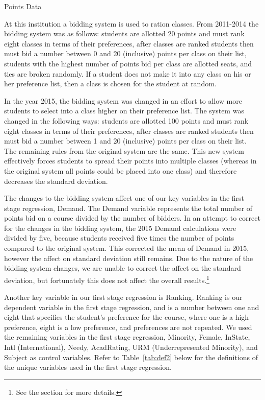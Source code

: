 \documentclass[12pt,a4paper,english,fleqn]{article}
\makeatletter
\newcommand{\tablelabel}[1]{Table~\ref{#1}}
\renewcommand\subsection{\@startsection{subsection}{2}
{\z@}{-3.25ex\@plus -1ex \@minus -.2ex}{1.5ex \@plus .2ex}{\normalfont\bf}}
\makeatother
\begin{document}
\clearpage{}

\subsection{Points Data}\label{pointsdata}

At this institution a bidding system is used to ration classes. 
From 2011-2014 the bidding system was as follows: 
students are allotted 20 points and must rank eight classes in terms of their preferences, 
after classes are ranked students then must bid a number between 0 and 20 (inclusive) points per class on their list, 
students with the highest number of points bid per class are allotted seats, and ties are broken randomly. 
If a student does not make it into any class on his or her preference list, then a class is chosen for the student at random. 

In the year 2015, the bidding system was changed in an effort to allow more students to select into a class higher on their preference list. 
The system was changed in the following ways:
students are allotted 100 points and must rank eight classes in terms of their preferences,
after classes are ranked students then must bid a number between 1 and 20 (inclusive) points per class on their list.
The remaining rules from the original system are the same. 
This new system effectively forces students to spread their points into multiple classes (whereas in the original system all points could be placed into one class) and therefore decreases the standard deviation.

The changes to the bidding system affect one of our key variables in the first stage regression, Demand. 
The Demand variable represents the total number of points bid on a course divided by the number of bidders. 
In an attempt to correct for the changes in the bidding system, the 2015 Demand calculations were divided by five, because students received five times the number of points compared to the original system. 
This corrected the mean of Demand in 2015, however the affect on standard deviation still remains. 
Due to the nature of the bidding system changes, we are unable to correct the affect on the standard deviation, but fortunately this does not affect the overall results.\footnote{See the  section for more details.} 

Another key variable in our first stage regression is Ranking. 
Ranking is our dependent variable in the first stage regression, and is a number between one and eight that specifies the student's preference for the course, where one is a high preference, eight is a low preference, and preferences are not repeated. 
We used the remaining variables in the first stage regression, Minority, Female, InState, Intl (International), Needy, AcadRating, URM (Underrepresented Minority), and Subject as control variables. Refer to \tablelabel{tab:def2} below for the definitions of the unique variables used in the first stage regression. 
\end{document}
